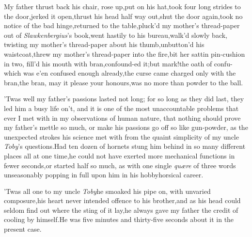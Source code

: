 \documentclass{article}
\begin{document}
\tsh My father thrust back his chair,\break
\tsh rose up,\tsk put on his
hat,\tsk took four long strides to the
door,\tsk jerked it open,\tsk thrust his head half
way out,\tsk shut the door again,\tsk took no
notice of the bad hinge,\tsk returned to the
table,\tsk\break pluck’d my mother’s thread-paper out of
\textit{Slawkenbergius}’s book,\tsk went hastily to his
bureau,\tsk walk’d slowly back, twisting my mother’s
thread-paper about his thumb,\tsk unbutton’d his
waistcoat,\tsh threw my mother’s thread-paper into the
fire,\tsk bit her sattin pin-cushion in two, fill’d
his mouth with bran,\tsk confound-\break ed it;\tsk but mark!\tsk the
oath of confu-
\tsh which was e’en confused enough already,\tsh the curse
came charged only with the bran,\tsk the bran, may it please
your honours,\tsk was no more than powder to the ball.

’Twas well my father’s passions lasted not long; for
so long as they did last, they led him a busy life on’t, and
it is one of the most unaccountable problems that ever I met with
in my observations of human nature, that nothing should prove my
father’s mettle so much, or make his passions go off so like
gun-powder, as the unexpected strokes his science met with from the
quaint simplicity of my uncle \textit{Toby}’s
questions.\tsh Had ten dozen of hornets stung him behind
in so many different places all at one time,\tsk he could not have
exerted more mechanical functions in fewer seconds,\tsk or
started half so much, as with one single \textit{quære} of
three words unseasonably popping in full upon him in his
hobbyhorsical career.

’Twas all one to my uncle \textit{Toby}\tsk he
smoaked his pipe on, with unvaried composure,\tsk his heart
never intended offence to his brother,\tsk and as his head could
seldom find out where the sting of it lay,\break\tsh he always
gave my father the credit of cooling by himself.\tsh He
was five minutes and thirty-five seconds about it in the present
case.
\end{document}
